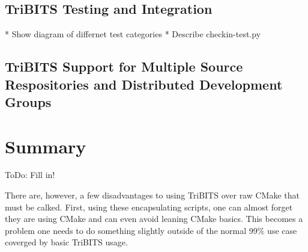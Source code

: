 \documentclass[10pt]{article}
\begin{document}
%
\subsection{TriBITS Testing and Integration}
%

* Show diagram of differnet test categories
* Describe checkin-test.py


%
\subsection{TriBITS Support for Multiple Source Respositories and Distributed Development Groups}
%


%
\section{Summary}
%

ToDo: Fill in!

There are, however, a few disadvantages to using TriBITS over raw CMake that must be calked.  First, using these encapsulating scripts, one can almost forget they are using CMake and can even avoid leaning CMake basics.  This becomes a problem one needs to do something slightly outside of the normal 99\% use case coverged by basic TriBITS usage.






\end{document}
